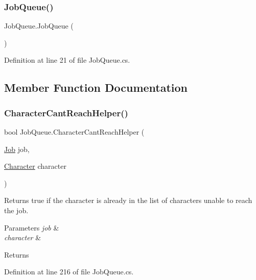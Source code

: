 \subsubsection{\texorpdfstring{Job\+Queue()}{JobQueue()}}
{\footnotesize\ttfamily Job\+Queue.\+Job\+Queue (\begin{DoxyParamCaption}{ }\end{DoxyParamCaption})}



Definition at line 21 of file Job\+Queue.\+cs.



\subsection{Member Function Documentation}
\mbox{\label{class_job_queue_a81f045f724b0f40fa79fe59f8784fe69}} 
\subsubsection{\texorpdfstring{Character\+Cant\+Reach\+Helper()}{CharacterCantReachHelper()}}
{\footnotesize\ttfamily bool Job\+Queue.\+Character\+Cant\+Reach\+Helper (\begin{DoxyParamCaption}\item[{\hyperlink{class_job}{Job}}]{job,  }\item[{\hyperlink{class_project_porcupine_1_1_entities_1_1_character}{Character}}]{character }\end{DoxyParamCaption})}



Returns true if the character is already in the list of characters unable to reach the job. 


\begin{DoxyParams}{Parameters}
{\em job} & \\
\hline
{\em character} & \\
\hline
\end{DoxyParams}
\begin{DoxyReturn}{Returns}

\end{DoxyReturn}


Definition at line 216 of file Job\+Queue.\+cs.

\mbox{\label{class_job_queue_a4c09bd98140e27617b5b80c7f9c5fd13}} 

